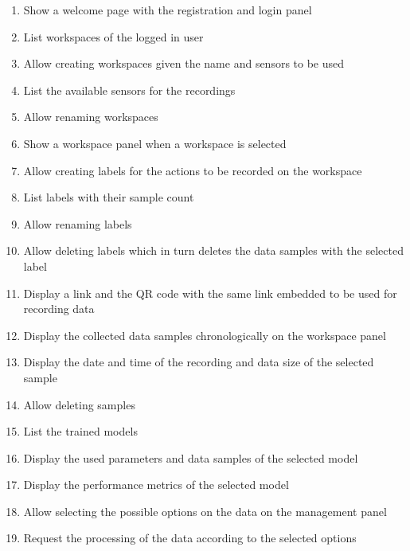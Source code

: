 \begin{enumerate}[{label = \textbf{/F{\protect\twodigits{\arabic{enumi}}}0/}, leftmargin = *}]
    \item Show a welcome page with the registration and login panel
    \item List workspaces of the logged in user
    \item Allow creating workspaces given the name and sensors to be used
    \item List the available sensors for the recordings
    \item Allow renaming workspaces
    \item Show a workspace panel when a workspace is selected
    \item Allow creating labels for the actions to be recorded on the workspace
    \item List labels with their sample count
    \item Allow renaming labels
    \item Allow deleting labels which in turn deletes the data samples with the selected label
    \item Display a link and the QR code with the same link embedded to be used for recording data
    \item Display the collected data samples chronologically on the workspace panel
    \item Display the date and time of the recording and data size of the selected sample
    \item Allow deleting samples
    \item List the trained models
    \item Display the used parameters and data samples of the selected model
    \item Display the performance metrics of the selected model
    \item Allow selecting the possible options on the data on the management panel %
    \item Request the processing of the data according to the selected options
\end{enumerate}

